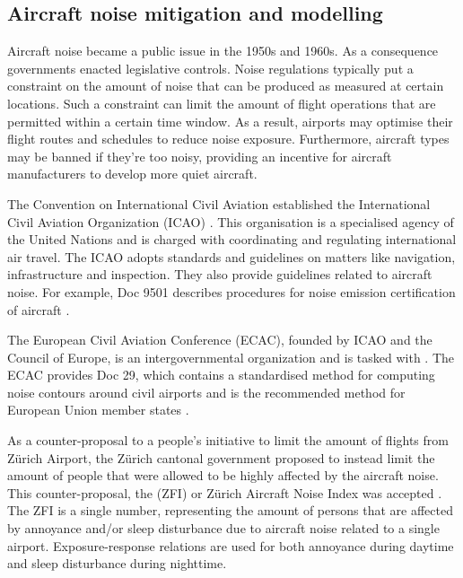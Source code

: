\subsection{Aircraft noise mitigation and modelling}
Aircraft noise became a public issue in the 1950s and 1960s. As a consequence
governments enacted legislative controls. Noise regulations typically put a
constraint on the amount of noise that can be produced as measured at certain
locations. Such a constraint can limit the amount of flight operations that are
permitted within a certain time window. As a result, airports may optimise their
flight routes and schedules to reduce noise exposure. Furthermore, aircraft
types may be banned if they're too noisy, providing an incentive for
aircraft manufacturers to develop more quiet aircraft.


The Convention on International Civil Aviation established the International
Civil Aviation Organization (ICAO) \cite{ICAO2017}. This organisation is a
specialised agency of the United Nations and is charged with coordinating and
regulating international air travel. The ICAO adopts standards and guidelines on
matters like navigation, infrastructure and inspection. They also provide
guidelines related to aircraft noise. For example, Doc 9501 describes procedures
for noise emission certification of aircraft \cite{ICAO_9501}.


The European Civil Aviation Conference (ECAC), founded by ICAO and the Council
of Europe, is an intergovernmental organization and is tasked with  \cite{ECAC2017}. The ECAC provides Doc 29, which
contains a standardised method for computing noise contours around civil
airports \cite{Doc29_fourth_2016} and is the recommended method for European
Union member states \cite{directive_2002_49_ec}.

As a counter-proposal to a people's initiative to limit the amount of flights
from Z\"{u}rich Airport, the Z\"{u}rich cantonal government proposed to instead limit
the amount of people that were allowed to be highly affected by the aircraft
noise. This counter-proposal, the  (ZFI) or Z\"{u}rich
Aircraft Noise Index was accepted \cite{Schaffer2012}. The ZFI is a single
number, representing the amount of persons that are affected by annoyance and/or
sleep disturbance due to aircraft noise related to a single airport.
Exposure-response relations are used for both annoyance during daytime and sleep
disturbance during nighttime.

